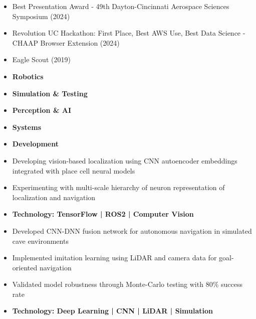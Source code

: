 \begin{itemize}
	\item Best Presentation Award - 49th Dayton-Cincinnati Aerospace Sciences Symposium (2024)
	\item Revolution UC Hackathon: First Place, Best AWS Use, Best Data Science - CHAAP Browser Extension (2024)
	\item Eagle Scout (2019)
\end{itemize}


\begin{itemize}
	\item\bf{Robotics}
	\item\bf{Simulation \& Testing}
	\item\bf{Perception \& AI}
	\item\bf{Systems}
	\item\bf{Development}
\end{itemize}


\begin{itemize}
	\item Developing vision-based localization using CNN autoencoder embeddings integrated with place cell neural models
	\item Experimenting with multi-scale hierarchy of neuron representation of localization and navigation
	\item\bf{Technology}{: TensorFlow | ROS2 | Computer Vision}
\end{itemize}
\smallskip


\begin{itemize}
	\item Developed CNN-DNN fusion network for autonomous navigation in simulated cave environments
	\item Implemented imitation learning using LiDAR and camera data for goal-oriented navigation
	\item Validated model robustness through Monte-Carlo testing with 80\% success rate
	\item\bf{Technology}{: Deep Learning | CNN | LiDAR | Simulation}
\end{itemize}
\smallskip


